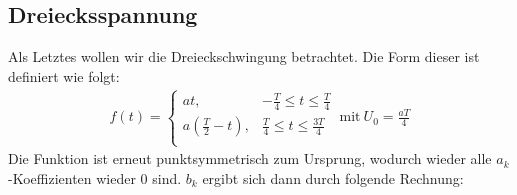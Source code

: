 \subsection*{Dreiecksspannung}
\label{sub:triangle}
Als Letztes wollen wir die Dreieckschwingung betrachtet. Die Form dieser ist definiert wie folgt:
\begin{gather}
    f(t) = 
    \begin{cases}
        at, & -\frac{T}{4} \leq t \leq \frac{T}{4} \\
        a\left(\frac{T}{2}-t\right), & \frac{T}{4} \leq t \leq \frac{3T}{4} \\
    \end{cases}
    ~\text{mit}~U_0 = \frac{aT}{4}
\end{gather} 
Die Funktion ist erneut punktsymmetrisch zum Ursprung, wodurch wieder alle $a_k$-Koeffizienten wieder 0 sind. $b_k$ ergibt sich dann durch folgende Rechnung:
